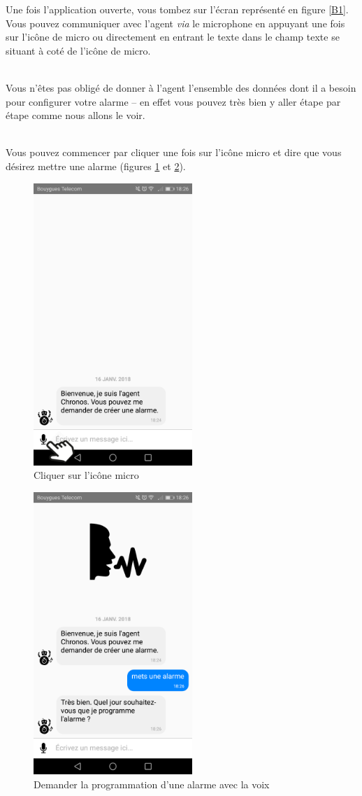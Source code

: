 Une fois l'application ouverte, vous tombez sur l'écran représenté en figure \ref{B1}. Vous pouvez communiquer avec l'agent \emph{via} le microphone en appuyant une fois sur l'icône de micro
ou directement en entrant le texte dans le champ texte se situant à coté de l'icône de micro. 

~\\\indent Vous n'êtes pas obligé de donner à l'agent l'ensemble des données
dont il a besoin pour configurer votre alarme \--- en effet vous pouvez très bien y aller étape par étape comme nous allons le voir. 

~\\\indent Vous pouvez commencer par cliquer
une fois sur l'icône micro et dire que vous désirez mettre une alarme (figures \ref{B} et \ref{C}).

\begin{figure}[H]
  \centering
  \includegraphics[width=6cm]{images/B.png}
  \caption{Cliquer sur l'icône micro}
  \label{B}
\end{figure}

\begin{figure}[H]
  \centering
  \includegraphics[width=6cm]{images/C.png}
  \caption{Demander la programmation d'une alarme avec la voix}
  \label{C}
\end{figure}

